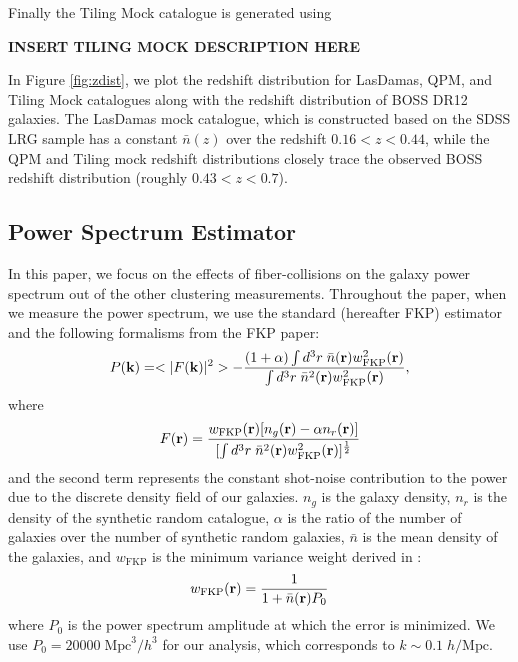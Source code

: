 \documentclass{emulateapj}
\begin{document}
Finally the Tiling Mock catalogue is generated using 

{\bf INSERT TILING MOCK DESCRIPTION HERE}

In Figure \ref{fig:zdist}, we plot the redshift distribution for LasDamas, QPM, and Tiling Mock catalogues along with the redshift distribution of BOSS DR12 galaxies. The LasDamas mock catalogue, which is constructed based on the SDSS LRG sample has a constant $\bar{n}(z)$ over the redshift $0.16 < z< 0.44$, while the QPM and Tiling mock redshift distributions closely trace the observed BOSS redshift distribution (roughly $0.43 < z < 0.7$). 

\subsection{Power Spectrum Estimator} \label{sec:pk_est}
In this paper, we focus on the effects of fiber-collisions on the galaxy power spectrum out of the other clustering measurements. Throughout the paper, when we measure the power spectrum, we use the standard \cite{Feldman:1994aa} (hereafter FKP) estimator and the following formalisms from the FKP paper: 
\begin{equation} \label{eq:fkppk}
P({\bf k}) = <|F({\bf k})|^2> - \frac{(1+\alpha) \int d^3r \;\bar{n}({\bf r})w_{\mathrm{FKP}}^2({\bf r})} {\int d^3r \; \bar{n}^2({\bf r})w_{\mathrm{FKP}}^2({\bf r})},
\end{equation}  
where
\begin{equation}
F({\bf r}) = \frac{w_\mathrm{FKP}({\bf r}) [n_g({\bf r}) - \alpha n_r({\bf r})]} {[\int d^3r \; \bar{n}^2({\bf r})w_\mathrm{FKP}^2({\bf r})]^{\frac{1}{2}}} 
\end{equation}
and the second term represents the constant shot-noise contribution to the power due to the discrete density field of our galaxies. $n_g$ is the galaxy density, $n_r$ is the density of the synthetic random catalogue, $\alpha$ is the ratio of the number of galaxies over the number of synthetic random galaxies, $\bar{n}$ is the mean density of the galaxies, and $w_{\mathrm{FKP}}$ is the minimum variance weight derived in \cite{Feldman:1994aa}: 
\begin{equation}
w_{\mathrm{FKP}} ({\bf r}) = \frac{1}{1+\bar{n}({\bf r}) P_0}
\end{equation}
where $P_0$ is the power spectrum amplitude at which the error is minimized. We use $P_0 = 20000\; \mathrm{Mpc}^3/h^3$ for our analysis, which corresponds to $k \sim 0.1\; h/\mathrm{Mpc}$.  
\end{document}

